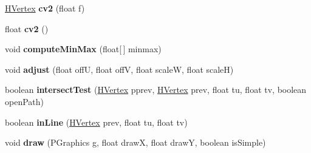 \begin{DoxyCompactItemize}
\item 
\hypertarget{classhype_1_1extended_1_1util_1_1_h_vertex_a11958cb10aab54c1c838b40643125ec5}{\hyperlink{classhype_1_1extended_1_1util_1_1_h_vertex}{H\-Vertex} {\bfseries cv2} (float f)}\label{classhype_1_1extended_1_1util_1_1_h_vertex_a11958cb10aab54c1c838b40643125ec5}

\item 
\hypertarget{classhype_1_1extended_1_1util_1_1_h_vertex_a895ba4dc0642f79c08023d88240cc479}{float {\bfseries cv2} ()}\label{classhype_1_1extended_1_1util_1_1_h_vertex_a895ba4dc0642f79c08023d88240cc479}

\item 
\hypertarget{classhype_1_1extended_1_1util_1_1_h_vertex_a37b5b52823a1f437b81c8d105291ce5e}{void {\bfseries compute\-Min\-Max} (float\mbox{[}$\,$\mbox{]} minmax)}\label{classhype_1_1extended_1_1util_1_1_h_vertex_a37b5b52823a1f437b81c8d105291ce5e}

\item 
\hypertarget{classhype_1_1extended_1_1util_1_1_h_vertex_aa095cff193c06f8367dd358a33c56b0a}{void {\bfseries adjust} (float off\-U, float off\-V, float scale\-W, float scale\-H)}\label{classhype_1_1extended_1_1util_1_1_h_vertex_aa095cff193c06f8367dd358a33c56b0a}

\item 
\hypertarget{classhype_1_1extended_1_1util_1_1_h_vertex_ae6dc06e25a734684f601becf26d701bd}{boolean {\bfseries intersect\-Test} (\hyperlink{classhype_1_1extended_1_1util_1_1_h_vertex}{H\-Vertex} pprev, \hyperlink{classhype_1_1extended_1_1util_1_1_h_vertex}{H\-Vertex} prev, float tu, float tv, boolean open\-Path)}\label{classhype_1_1extended_1_1util_1_1_h_vertex_ae6dc06e25a734684f601becf26d701bd}

\item 
\hypertarget{classhype_1_1extended_1_1util_1_1_h_vertex_a8cbe4bba47a94dad846ddc69874a850d}{boolean {\bfseries in\-Line} (\hyperlink{classhype_1_1extended_1_1util_1_1_h_vertex}{H\-Vertex} prev, float tu, float tv)}\label{classhype_1_1extended_1_1util_1_1_h_vertex_a8cbe4bba47a94dad846ddc69874a850d}

\item 
\hypertarget{classhype_1_1extended_1_1util_1_1_h_vertex_ac1def2460d3adcf25f6da01d208b865c}{void {\bfseries draw} (P\-Graphics g, float draw\-X, float draw\-Y, boolean is\-Simple)}\label{classhype_1_1extended_1_1util_1_1_h_vertex_ac1def2460d3adcf25f6da01d208b865c}

\end{DoxyCompactItemize}



